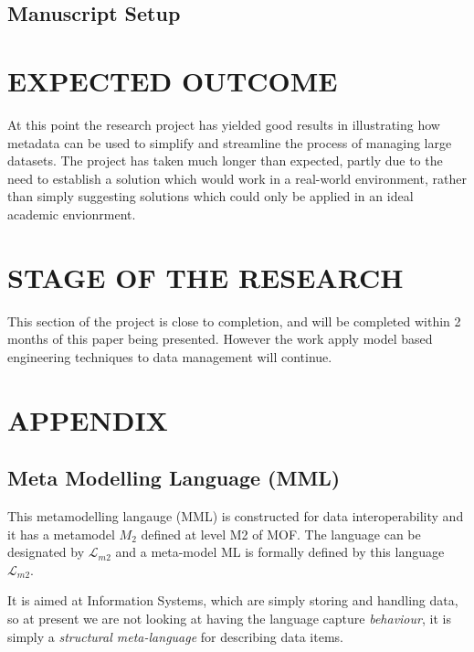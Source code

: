 \documentclass[a4paper,twoside]{article}
\newcommand{\Lagr}{\mathcal{L}}
\begin{document}
\cite{} 



\subsection{Manuscript Setup}

\noindent 

\section{\uppercase{EXPECTED OUTCOME}}

\noindent At this point the research project has yielded good results in illustrating how metadata can be used to simplify and streamline the process of managing large datasets. The project has taken much longer than expected, partly due to the need to establish a solution which would work in a real-world environment, rather than simply suggesting solutions which could only be applied in an ideal academic envionrment. 

\section{\uppercase{STAGE OF THE RESEARCH}}
\noindent This section of the project is close to completion, and will be completed within 2 months of this paper being presented. However the work apply model based engineering techniques to data management will continue. 


{\small
}


\section*{\uppercase{Appendix}}
\renewcommand{\thesubsection}{\Alph{subsection}}
\noindent 
\subsection{Meta Modelling Language (MML)}


This metamodelling langauge (MML) is constructed for data interoperability and it has a metamodel \textbf{$M_2$} defined at level M2 of MOF. The language can be designated by $\Lagr_{m2}$ and a meta-model ML is formally defined by this language $\Lagr_{m2}$.

It is aimed at Information Systems, which are simply storing and handling data, so at present we are not looking at having the language capture \emph{behaviour}, it is simply a \emph{structural meta-language} for describing data items. 
\end{document}
